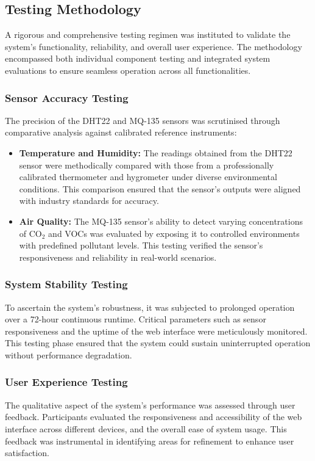 \documentclass[a4paper, 12pt]{report}
\begin{document}
\subsection{Testing Methodology}
A rigorous and comprehensive testing regimen was instituted to validate the system's functionality, reliability, and overall user experience. The methodology encompassed both individual component testing and integrated system evaluations to ensure seamless operation across all functionalities.

\subsubsection{Sensor Accuracy Testing}
The precision of the DHT22 and MQ-135 sensors was scrutinised through comparative analysis against calibrated reference instruments:
\begin{itemize}
    \item \textbf{Temperature and Humidity:} The readings obtained from the DHT22 sensor were methodically compared with those from a professionally calibrated thermometer and hygrometer under diverse environmental conditions. This comparison ensured that the sensor's outputs were aligned with industry standards for accuracy.
    \item \textbf{Air Quality:} The MQ-135 sensor's ability to detect varying concentrations of CO$_2$ and VOCs was evaluated by exposing it to controlled environments with predefined pollutant levels. This testing verified the sensor's responsiveness and reliability in real-world scenarios.
\end{itemize}

\subsubsection{System Stability Testing}
To ascertain the system's robustness, it was subjected to prolonged operation over a 72-hour continuous runtime. Critical parameters such as sensor responsiveness and the uptime of the web interface were meticulously monitored. This testing phase ensured that the system could sustain uninterrupted operation without performance degradation.

\subsubsection{User Experience Testing}
The qualitative aspect of the system's performance was assessed through user feedback. Participants evaluated the responsiveness and accessibility of the web interface across different devices, and the overall ease of system usage. This feedback was instrumental in identifying areas for refinement to enhance user satisfaction.
\end{document}
